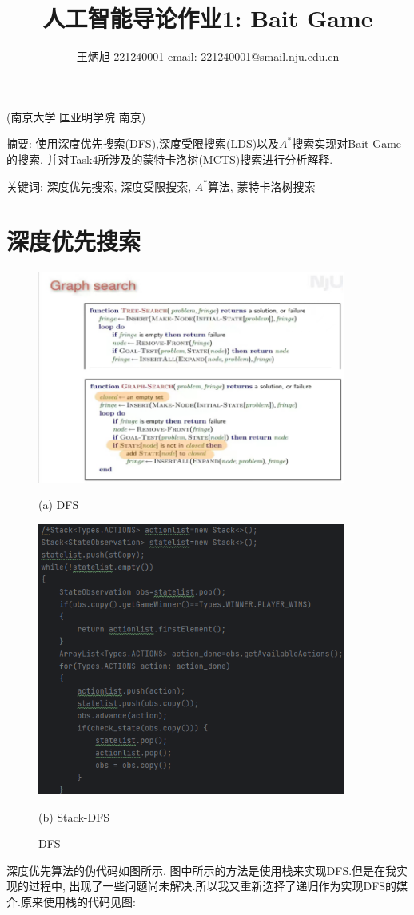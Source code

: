 \documentclass{article}
\title{人工智能导论作业1: Bait Game}
\author{王炳旭 221240001  email: 221240001@smail.nju.edu.cn}
\begin{document}
\maketitle
{\fangsong (南京大学 \qquad  匡亚明学院 \qquad 南京)}

{\heiti 摘\quad 要:} {\fangsong 使用深度优先搜索(DFS),深度受限搜索(LDS)以及$A^{*}$搜索实现对Bait Game的搜索. 并对Task4所涉及的蒙特卡洛树(MCTS)搜索进行分析解释.}

{\heiti 关键词:} {\fangsong 深度优先搜索, 深度受限搜索, $A^{*}$算法, 蒙特卡洛树搜索}

\section{深度优先搜索}
\begin{figure}[htbp]
\begin{minipage}[t]{0.5\linewidth}
\centering
\includegraphics[width=0.9\textwidth]{DFS}
\centerline{(a) DFS}
\end{minipage}%
\begin{minipage}[t]{0.5\linewidth}
\centering
\includegraphics[width=0.9\textwidth]{Stack_DFS}
\centerline{(b) Stack-DFS}
\end{minipage}
\caption{DFS}
\end{figure}
深度优先算法的伪代码如图所示, 图中所示的方法是使用栈来实现DFS.但是在我实现的过程中, 出现了一些问题尚未解决.所以我又重新选择了递归作为实现DFS的媒介.原来使用栈的代码见图:
\end{document}
